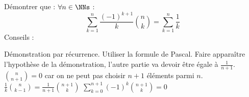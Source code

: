 %
%
Démontrer que : $\forall n \in \NNs$ :
$$\sum\limits_{k=1}^{n}\frac{(-1)^{k+1}}{k}\binom{n}{k} = \sum\limits_{k=1}^n \frac{1}{k}$$
Conseils :
\begin{tasks}
	\task Démonstration par récurrence.
	\task Utiliser la formule de Pascal.
	\task Faire apparaître l'hypothèse de la démonstration, l'autre partie va devoir être égale à $\frac{1}{n+1}$.
	\task $\binom{n}{n+1}=0$ car on ne peut pas choisir $n+1$ éléments parmi $n$.
	\task $\frac{1}{k}\binom{n}{k-1} = \frac{1}{n+1}\binom{n+1}{k} $
	\task $\sum\limits_{k=0}^{n+1} (-1)^{k}\binom{n+1}{k} = 0$
\end{tasks}

